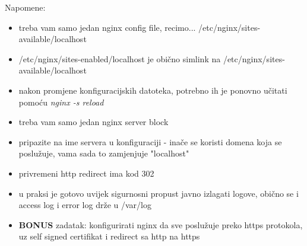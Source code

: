 \documentclass[12pt,a4paper]{article}
\begin{document}
Napomene:
\begin{itemize}
	\item treba vam samo jedan nginx config file, recimo... /etc/nginx/sites-available/localhost
  \item /etc/nginx/sites-enabled/localhost je obično simlink na /etc/nginx/sites-available/localhost
  \item nakon promjene konfiguracijskih datoteka, potrebno ih je ponovno učitati pomoću \textit{nginx -s reload}
  \item treba vam samo jedan nginx server block
  \item pripazite na ime servera u konfiguraciji - inače se koristi domena koja se poslužuje, vama sada to zamjenjuje "localhost"
  \item privremeni http redirect ima kod 302
  \item u praksi je gotovo uvijek sigurnosni propust javno izlagati logove, obično se i access log i error log drže u /var/log
  \item \textbf{BONUS} zadatak: konfigurirati nginx da sve poslužuje preko https protokola, uz self signed certifikat i redirect sa http na https
\end{itemize}
\end{document}
